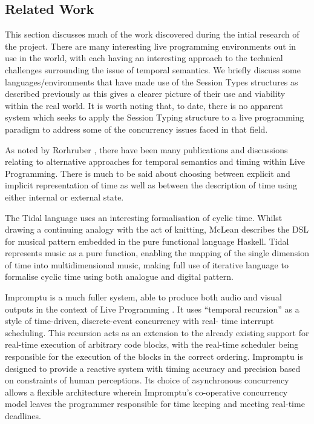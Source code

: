 \documentclass[11pt]{scrartcl}
\begin{document}
\subsection{Related Work}
This section discusses much of the work discovered during the intial research 
of the project. There are many interesting live programming environments out 
in use in the world, with each having an interesting approach to the technical 
challenges surrounding the issue of temporal semantics. We briefly discuss 
some languages/environments that have made use of the Session Types structures 
as described previously as this gives a clearer picture of their use and 
viability within the real world. It is worth noting that, to date, there is no 
apparent system which seeks to apply the Session Typing structure to a live 
programming paradigm to address some of the concurrency issues faced in that 
field.

As noted by Rorhruber \cite{BMNR14}, there have been many publications and 
discussions relating to alternative approaches for temporal semantics and 
timing within Live Programming. There is much to be said about choosing 
between explicit and implicit representation of time as well as between the 
description of time using either internal or external state.

The Tidal language \cite{McL13} uses an interesting formalisation of cyclic 
time. Whilst drawing a continuing analogy with the act of knitting, McLean 
describes the DSL for musical pattern embedded in the pure functional language 
Haskell. Tidal represents music as a pure function, enabling the mapping of 
the single dimension of time into multidimensional music, making full use of 
iterative language to formalise cyclic time using both analogue and digital 
pattern.

Impromptu is a much fuller system, able to produce both audio and visual 
outputs in the context of Live Programming \cite{SG10}. It uses ``temporal 
recursion'' as a style of time-driven, discrete-event concurrency with real-
time interrupt scheduling. This recursion acts as an extension to the already 
existing support for real-time execution of arbitrary code blocks, with the 
real-time scheduler being responsible for the execution of the blocks in the 
correct ordering. Impromptu is designed to provide a reactive system with 
timing accuracy and precision based on constraints of human perceptions. Its 
choice of asynchronous concurrency allows a flexible architecture wherein 
Impromptu's co-operative concurrency model leaves the programmer responsible 
for time keeping and meeting real-time deadlines.
\end{document}
